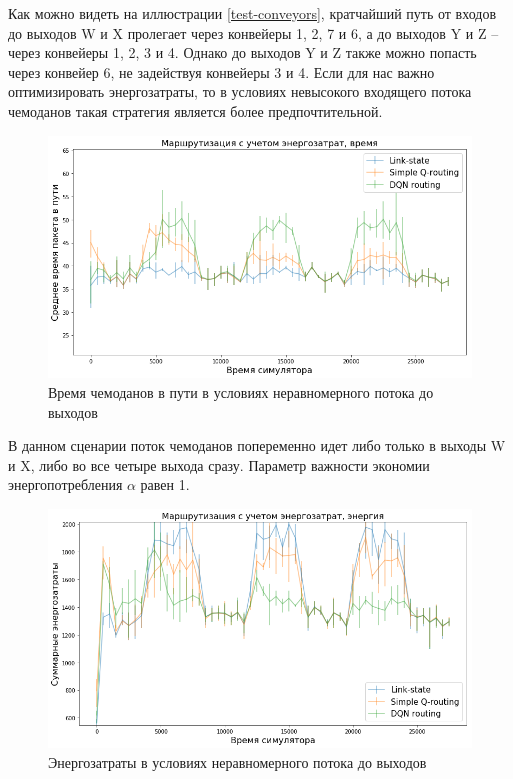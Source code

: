 \documentclass[specification, annotation]{itmo-student-thesis}
\begin{document}
Как можно видеть на иллюстрации \ref{test-conveyors}, кратчайший путь от входов
до выходов W и X пролегает через конвейеры 1, 2, 7 и 6, а до выходов Y и Z --
через конвейеры 1, 2, 3 и 4. Однако до выходов Y и Z также можно попасть через
конвейер 6, не задействуя конвейеры 3 и 4. Если для нас важно оптимизировать
энергозатраты, то в условиях невысокого входящего потока чемоданов такая
стратегия является более предпочтительной.

\begin{figure}[!h]
  \caption{Время чемоданов в пути в условиях неравномерного потока до
    выходов}\label{experiment-conveyors-en1-time}
  \centering
  \includegraphics[scale=0.6]{experiment-conveyors-en1-time}
\end{figure}

В данном сценарии поток чемоданов попеременно идет либо только в выходы W и X,
либо во все четыре выхода сразу. Параметр важности экономии энергопотребления
$\alpha$ равен 1.

\begin{figure}[!h]
  \caption{Энергозатраты в условиях неравномерного потока до
    выходов}\label{experiment-conveyors-en1-energy}
  \centering
  \includegraphics[scale=0.6]{experiment-conveyors-en1-energy}
\end{figure}
\end{document}

